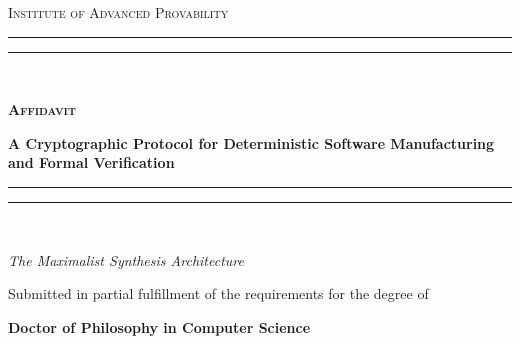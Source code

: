\documentclass[
    12pt,               %
    a4paper,            %
    twoside,            %
    openright,          %
    titlepage,          %
    fleqn,              %
    leqno,              %
    final               %
]{book}
\theoremstyle{definition}
\theoremstyle{plain}
\newcommand{\sysname}{\textsc{Affidavit}}
\begin{document}
\frontmatter

\begin{titlepage}
    \begin{center}
        \vspace*{2cm}
        
        {\scshape\LARGE Institute of Advanced Provability \par}
        \vspace{1.5cm}
        
        \rule{\textwidth}{1.6pt}\vspace*{-\baselineskip}\vspace*{2pt} %
        \rule{\textwidth}{0.4pt}\\[\baselineskip] %
        
        {\Huge\bfseries\sffamily \sysname{}\par}
        \vspace{0.5cm}
        {\LARGE\bfseries\sffamily A Cryptographic Protocol for Deterministic Software Manufacturing and Formal Verification\par}
        
        \rule{\textwidth}{0.4pt}\vspace*{-\baselineskip}\vspace{3.2pt} %
        \rule{\textwidth}{1.6pt}\\[\baselineskip] %
        
        \vspace{1.5cm}
        {\Large\itshape The Maximalist Synthesis Architecture\par}
        \vspace{2.5cm}
        
        Submitted in partial fulfillment of the requirements for the degree of\par
        \vspace{0.5cm}
        \textbf{\large Doctor of Philosophy in Computer Science}
        
        \vspace{1.5cm}
        

\end{center}
\end{titlepage}
\end{document}
